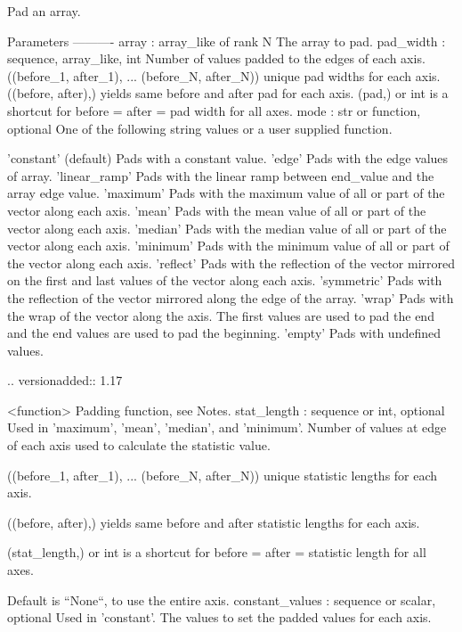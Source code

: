 \begin{DoxyVerb}Pad an array.

Parameters
----------
array : array_like of rank N
    The array to pad.
pad_width : {sequence, array_like, int}
    Number of values padded to the edges of each axis.
    ((before_1, after_1), ... (before_N, after_N)) unique pad widths
    for each axis.
    ((before, after),) yields same before and after pad for each axis.
    (pad,) or int is a shortcut for before = after = pad width for all
    axes.
mode : str or function, optional
    One of the following string values or a user supplied function.

    'constant' (default)
        Pads with a constant value.
    'edge'
        Pads with the edge values of array.
    'linear_ramp'
        Pads with the linear ramp between end_value and the
        array edge value.
    'maximum'
        Pads with the maximum value of all or part of the
        vector along each axis.
    'mean'
        Pads with the mean value of all or part of the
        vector along each axis.
    'median'
        Pads with the median value of all or part of the
        vector along each axis.
    'minimum'
        Pads with the minimum value of all or part of the
        vector along each axis.
    'reflect'
        Pads with the reflection of the vector mirrored on
        the first and last values of the vector along each
        axis.
    'symmetric'
        Pads with the reflection of the vector mirrored
        along the edge of the array.
    'wrap'
        Pads with the wrap of the vector along the axis.
        The first values are used to pad the end and the
        end values are used to pad the beginning.
    'empty'
        Pads with undefined values.

        .. versionadded:: 1.17

    <function>
        Padding function, see Notes.
stat_length : sequence or int, optional
    Used in 'maximum', 'mean', 'median', and 'minimum'.  Number of
    values at edge of each axis used to calculate the statistic value.

    ((before_1, after_1), ... (before_N, after_N)) unique statistic
    lengths for each axis.

    ((before, after),) yields same before and after statistic lengths
    for each axis.

    (stat_length,) or int is a shortcut for before = after = statistic
    length for all axes.

    Default is ``None``, to use the entire axis.
constant_values : sequence or scalar, optional
    Used in 'constant'.  The values to set the padded values for each
    axis.


\end{DoxyVerb}
